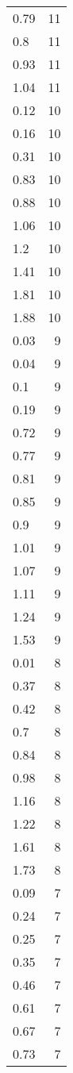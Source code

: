 \begin{table}[ht]
\begin{tabular}{lr}
  0.79 &  11 \\ 
  0.8 &  11 \\ 
  0.93 &  11 \\ 
  1.04 &  11 \\ 
  0.12 &  10 \\ 
  0.16 &  10 \\ 
  0.31 &  10 \\ 
  0.83 &  10 \\ 
  0.88 &  10 \\ 
  1.06 &  10 \\ 
  1.2 &  10 \\ 
  1.41 &  10 \\ 
  1.81 &  10 \\ 
  1.88 &  10 \\ 
  0.03 &   9 \\ 
  0.04 &   9 \\ 
  0.1 &   9 \\ 
  0.19 &   9 \\ 
  0.72 &   9 \\ 
  0.77 &   9 \\ 
  0.81 &   9 \\ 
  0.85 &   9 \\ 
  0.9 &   9 \\ 
  1.01 &   9 \\ 
  1.07 &   9 \\ 
  1.11 &   9 \\ 
  1.24 &   9 \\ 
  1.53 &   9 \\ 
  0.01 &   8 \\ 
  0.37 &   8 \\ 
  0.42 &   8 \\ 
  0.7 &   8 \\ 
  0.84 &   8 \\ 
  0.98 &   8 \\ 
  1.16 &   8 \\ 
  1.22 &   8 \\ 
  1.61 &   8 \\ 
  1.73 &   8 \\ 
  0.09 &   7 \\ 
  0.24 &   7 \\ 
  0.25 &   7 \\ 
  0.35 &   7 \\ 
  0.46 &   7 \\ 
  0.61 &   7 \\ 
  0.67 &   7 \\ 
  0.73 &   7 \\ 

\end{tabular}
\end{table}
